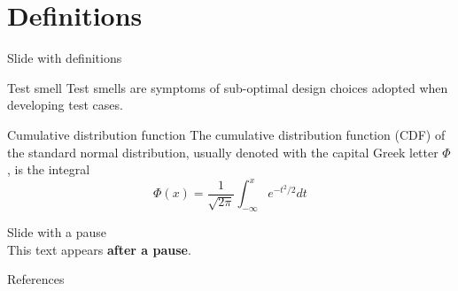 \documentclass[aspectratio=169, 10pt]{beamer}
\begin{document}
\section{Definitions}
\begin{frame}[fragile]{Slide with definitions}
    \begin{defbox}{Test smell \cite{pontillo2024}}
        Test smells are symptoms of sub-optimal design choices adopted when developing test cases.
    \end{defbox}
    \vspace{0.2cm}
    \begin{defbox}{Cumulative distribution function\cite{wiki:normal_dist}}
        The cumulative distribution function (CDF) of the standard normal distribution, usually denoted with the capital Greek letter $\Phi$, is the integral 
        \begin{equation}
            \Phi(x) = \frac{1}{\sqrt{2\pi}}\int_{-\infty}^{x}{e^{-t^2 / 2}dt}
        \end{equation}
    \end{defbox}
\end{frame}


\begin{frame}[fragile]{Slide with a pause}
    \lipsum[1][1-5]\\[2ex]
    \pause
    \justifying
    This text appears \textbf{after a pause}. \lipsum[1][6-15]
\end{frame}


\renewcommand{\bibsection}{}  %
\begin{frame}{References}

\scriptsize

\end{frame}
\end{document}
